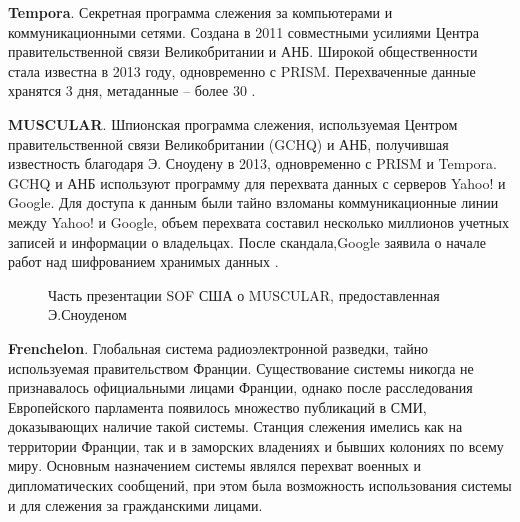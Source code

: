 	\textbf{Tempora}. Секретная программа слежения за компьютерами и коммуникационными сетями. Создана в 2011 совместными усилиями  Центра правительственной связи Великобритании и АНБ.	Широкой общественности стала известна в 2013 году, одновременно с PRISM. Перехваченные данные хранятся 3 дня, метаданные -- более 30 \cite{Tempora}. %
	
	
	\textbf{MUSCULAR}.    Шпионская  программа слежения, используемая Центром правительственной связи Великобритании (GCHQ) и АНБ, получившая известность благодаря Э. Сноудену в 2013, одновременно с PRISM и Tempora. GCHQ и АНБ используют программу для перехвата данных с серверов Yahoo! и Google. Для доступа к данным были тайно взломаны коммуникационные линии между Yahoo! и Google, объем перехвата составил  несколько миллионов учетных записей и информации о владельцах.  После скандала,Google заявила о начале работ над шифрованием хранимых данных \cite{MUSCULAR}. 	%
	\begin{figure*}[h!]
		\caption{ Часть презентации SOF США о MUSCULAR, предоставленная Э.Сноуденом}
	\end{figure*} 
	
	\textbf{Frenchelon}. Глобальная система радиоэлектронной разведки, тайно используемая правительством Франции. Существование системы никогда не признавалось официальными лицами Франции, однако после расследования Европейского парламента появилось множество публикаций в СМИ, доказывающих наличие такой системы. %
	Станция слежения имелись как на территории Франции, так и в заморских владениях и бывших колониях по всему миру. Основным назначением системы являлся перехват военных и дипломатических сообщений, при этом была возможность использования системы и для слежения за гражданскими лицами. 
	
